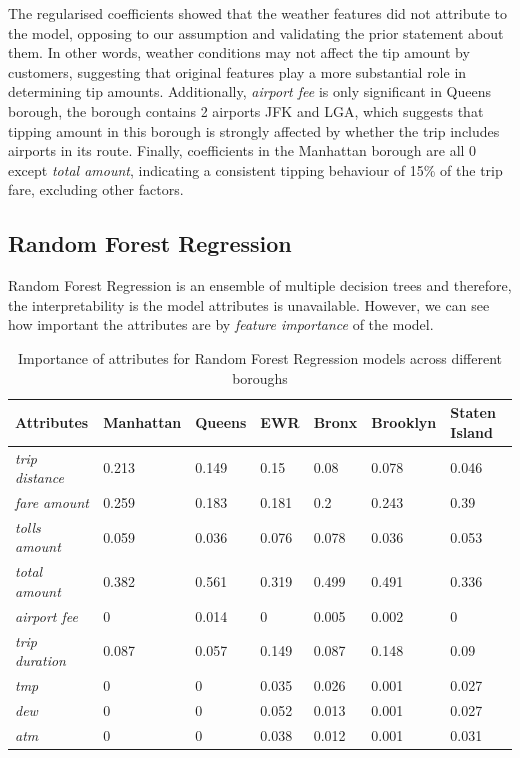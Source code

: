 \documentclass[11pt]{article}
\begin{document}
The regularised coefficients showed that the weather features did not attribute to the model, opposing to our assumption and validating the prior statement about them. In other words, weather conditions may not affect the tip amount by customers, suggesting that original features play a more substantial role in determining tip amounts. Additionally, \textit{airport fee} is only significant in Queens borough, the borough contains 2 airports JFK and LGA, which suggests that tipping amount in this borough is strongly affected by whether the trip includes airports in its route. Finally, coefficients in the Manhattan borough are all 0 except \textit{total amount}, indicating a consistent tipping behaviour of 15\% of the trip fare, excluding other factors. 

\subsection{Random Forest Regression}

Random Forest Regression is an ensemble of multiple decision trees and therefore, the interpretability is the model attributes is unavailable. However, we can see how important the attributes are by \textit{feature importance} of the model.

\begin{table} [h!]
\begin{center}
\begin{tabular}{|m{2.5cm}||m{2cm}|m{1.5cm}|m{1.5cm}|m{1.5cm}|m{2cm}|m{2.5cm}|}
\hline
Attributes & Manhattan & Queens & EWR & Bronx & Brooklyn & Staten Island \\
\hline
\textit{trip distance} & 0.213 & 0.149 & 0.15 & 0.08 & 0.078 & 0.046 \\
\textit{fare amount}   & 0.259 & 0.183 & 0.181 & 0.2 & 0.243 & 0.39 \\
\textit{tolls amount}  & 0.059 & 0.036 & 0.076 & 0.078 & 0.036 & 0.053 \\
\textit{total amount}  & 0.382 & 0.561 & 0.319 & 0.499 & 0.491 & 0.336 \\
\textit{airport fee}   & 0 & 0.014 & 0 & 0.005 & 0.002 & 0 \\
\textit{trip duration} & 0.087 & 0.057 & 0.149 & 0.087 & 0.148 & 0.09 \\
\textit{tmp} & 0 & 0 & 0.035 & 0.026 & 0.001 & 0.027 \\
\textit{dew} & 0 & 0 & 0.052 & 0.013 & 0.001 & 0.027 \\
\textit{atm} & 0 & 0 & 0.038 & 0.012 & 0.001 & 0.031 \\
\hline
\end{tabular}
\caption{Importance of attributes for Random Forest Regression models across different boroughs}
\end{center}
\end{table}
\end{document}
